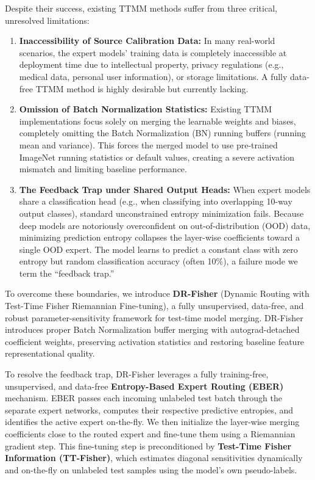\documentclass{article}
\theoremstyle{plain}
\theoremstyle{definition}
\theoremstyle{remark}
\begin{document}
Despite their success, existing TTMM methods suffer from three critical, unresolved limitations:
\begin{enumerate}
    \item \textbf{Inaccessibility of Source Calibration Data:} In many real-world scenarios, the expert models' training data is completely inaccessible at deployment time due to intellectual property, privacy regulations (e.g., medical data, personal user information), or storage limitations. A fully data-free TTMM method is highly desirable but currently lacking.
    \item \textbf{Omission of Batch Normalization Statistics:} Existing TTMM implementations focus solely on merging the learnable weights and biases, completely omitting the Batch Normalization (BN) running buffers (running mean and variance). This forces the merged model to use pre-trained ImageNet running statistics or default values, creating a severe activation mismatch and limiting baseline performance.
    \item \textbf{The Feedback Trap under Shared Output Heads:} When expert models share a classification head (e.g., when classifying into overlapping 10-way output classes), standard unconstrained entropy minimization fails. Because deep models are notoriously overconfident on out-of-distribution (OOD) data, minimizing prediction entropy collapses the layer-wise coefficients toward a single OOD expert. The model learns to predict a constant class with zero entropy but random classification accuracy (often 10\%), a failure mode we term the ``feedback trap.''
\end{enumerate}

To overcome these boundaries, we introduce \textbf{DR-Fisher} (Dynamic Routing with Test-Time Fisher Riemannian Fine-tuning), a fully unsupervised, data-free, and robust parameter-sensitivity framework for test-time model merging. DR-Fisher introduces proper Batch Normalization buffer merging with autograd-detached coefficient weights, preserving activation statistics and restoring baseline feature representational quality.

To resolve the feedback trap, DR-Fisher leverages a fully training-free, unsupervised, and data-free \textbf{Entropy-Based Expert Routing (EBER)} mechanism. EBER passes each incoming unlabeled test batch through the separate expert networks, computes their respective predictive entropies, and identifies the active expert on-the-fly. We then initialize the layer-wise merging coefficients close to the routed expert and fine-tune them using a Riemannian gradient step. This fine-tuning step is preconditioned by \textbf{Test-Time Fisher Information (TT-Fisher)}, which estimates diagonal sensitivities dynamically and on-the-fly on unlabeled test samples using the model's own pseudo-labels.
\end{document}
